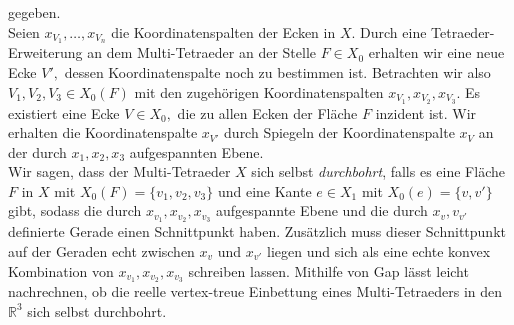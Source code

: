 \documentclass[12pt,titlepage,twoside,cleardoublepage]{article}
\theoremstyle{nummermitklammern}
\numberwithin{equation}{section}
\begin{document}
gegeben.\\
Seien $x_{V_1},\ldots,x_{V_n}$ die Koordinatenspalten der Ecken in $X.$
Durch eine Tetraeder-Erweiterung an dem Multi-Tetraeder an der Stelle $F\in X_0$ erhalten wir eine neue Ecke $V',$ dessen Koordinatenspalte noch zu bestimmen ist. 
Betrachten wir also $V_1,V_2,V_3\in X_0(F)$ mit den zugehörigen Koordinatenspalten $x_{V_1},x_{V_2},x_{V_3}.$ Es existiert eine Ecke $V\in X_0,$ die zu allen Ecken der Fläche $F$ inzident ist. Wir erhalten die Koordinatenspalte $x_{V'}$ durch Spiegeln der Koordinatenspalte $x_V$ an der durch $x_{1},x_{2},x_{3}$ aufgespannten Ebene. \\
Wir sagen, dass der Multi-Tetraeder $X$ sich selbst \emph{durchbohrt}, falls es eine Fläche $F$ in $X$ mit $X_0(F)=\{v_1,v_2,v_3\}$ und eine Kante $e\in X_1$ mit $X_0(e)=\{v,v'\}$ gibt, sodass die durch $x_{v_1},x_{v_2},x_{v_3}$ aufgespannte Ebene und die durch $x_v,v_{v'}$ definierte Gerade  einen Schnittpunkt haben. Zusätzlich muss dieser Schnittpunkt auf der Geraden echt zwischen $x_{v}$ und $x_{v'}$ liegen und sich als eine echte konvex Kombination von $x_{v_1},x_{v_2},x_{v_3}$ schreiben lassen. 
Mithilfe von Gap lässt leicht nachrechnen, ob die reelle vertex-treue Einbettung eines Multi-Tetraeders in den $\mathbb{R}^3$ sich selbst durchbohrt.
\end{document}
